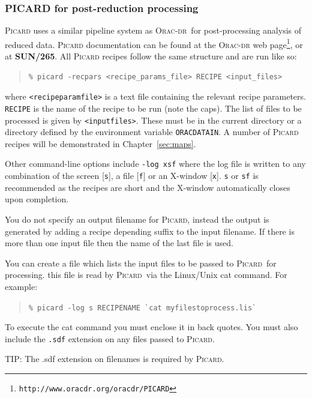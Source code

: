 \documentclass[twoside,11pt]{article}
\newcommand{\htmladdnormallinkfoot}[2]{#1\footnote{#2}}
\newcommand{\htmladdnormallink}[2]{#1}
\newcommand{\htmlref}[2]{#1}
\newenvironment{latexonly}{}{}
\newcommand{\latexhtml}[2]{#1}
\newcommand{\xref}[3]{#1}
\renewcommand{\_}{\texttt{\symbol{95}}}
\newenvironment{fmpage}[1]{\begin{lrbox}{\fmbox}\begin{minipage}{#1}}{\end{minipage}\end{lrbox}\fbox{\usebox{\fmbox}}}
\newenvironment{myquote}{
   \color{MidnightBlue}\begin{quote}\begin{small}}{
   \end{small}\end{quote}
}
\newcommand{\oracdr}{\htmladdnormallink{\textsc{Orac-dr}}{http://www.oracdr.org/oracdr}}
\newcommand{\picard}{\xref{\textsc{Picard}}{sun265}{}}
\newcommand{\task}[1]{\textsf{#1}}
\newcommand{\param}[1]{\texttt{#1}}
\newcommand{\envvar}[1]{\texttt{#1}}
\newcommand{\file}[1]{\texttt{#1}}
\newcommand{\url}[1]{\texttt{#1}}
\newcommand{\picardsun}{\xref{\textbf{SUN/265}}{sun265}{}}
\newcommand{\cref}[3]{\latexhtml{#1~\ref{#2}}{\htmlref{#3}{#2}}}
\renewenvironment{myquote}{
      \begin{quote}\begin{small}}{
      \end{small}\end{quote}
   }
\begin{document}
\subsubsection{PICARD for post-reduction processing}

\textsc{Picard} uses a similar pipeline system as \oracdr\ for
post-processing analysis of reduced data. \textsc{Picard}
documentation can be found at \htmladdnormallinkfoot{the
\textsc{Orac-dr} web page}{\url{http://www.oracdr.org/oracdr/PICARD}}, or at
\picardsun. All \textsc{Picard} recipes follow the same structure and
are run like so:
\begin{myquote}
\begin{verbatim}
% picard -recpars <recipe_params_file> RECIPE <input_files>
\end{verbatim}
\end{myquote}
where \param{<recipe\_param\_file>} is a text file containing the
relevant recipe parameters. \param{RECIPE} is the name of the recipe
to be run (note the caps). The list of files to be processed is given
by  \param{<input\_files>}. These must be in the current directory or a
directory defined by the environment variable \envvar{ORAC\_DATA\_IN}. A
number of \textsc{Picard} recipes will be demonstrated in
\cref{Chapter}{sec:maps}{Reducing your data}.

Other command-line options include \texttt{-log xsf} where the log
file is written to any combination of the screen [\texttt{s}], a file
[\texttt{f}] or an X-window [\texttt{x}]. \texttt{s} or \texttt{sf} is
recommended as the recipes are short and the X-window automatically
closes upon completion.

You do not specify an output filename for \picard, instead the output is
generated by adding a recipe depending suffix to the input filename. If
there is more than one input file then the name of the last file is used.

You can create a file which lists the input files to be passed to \picard\ for
processing. this file is read by \picard\ via the Linux/Unix \task{cat}
command. For example:
\begin{myquote}
\texttt{\% picard -log s RECIPE\_NAME \`{}cat myfilestoprocess.lis\`{}}
\end{myquote}
To execute the \task{cat} command you must enclose it in back quotes. You must
also include the \file{.sdf} extension on any files passed to \picard.

\begin{latexonly}
\begin{center}
\begin{fmpage}{0.95\linewidth}
\vspace{0.1cm}
TIP: The .sdf extension on filenames is required by \textsc{Picard}.
\end{fmpage}
\end{center}
\end{latexonly}
\end{document}
